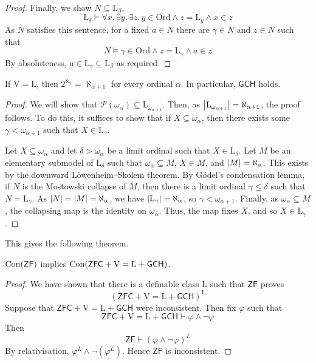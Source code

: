 \begin{proof}
    Finally, we show \( N \subseteq \mathrm{L}_\beta \).
    \[ \mathrm{L}_\delta \vDash \forall x.\, \exists y.\, \exists z.\, y \in \mathrm{Ord} \wedge z = \mathrm{L}_y \wedge x \in z \]
    As \( N \) satisfies this sentence, for a fixed \( a \in N \) there are \( \gamma \in N \) and \( z \in N \) such that
    \[ N \vDash \gamma \in \mathrm{Ord} \wedge z = \mathrm{L}_\gamma \wedge a \in z \]
    By absoluteness, \( a \in \mathrm{L}_\gamma \subseteq \mathrm{L}_\beta \) as required.
\end{proof}
\begin{theorem}
    If \( \mathrm{V} = \mathrm{L} \), then \( 2^{\aleph_\alpha} = \aleph_{\alpha + 1} \) for every ordinal \( \alpha \).
    In particular, \( \mathsf{GCH} \) holds.
\end{theorem}
\begin{proof}
    We will show that \( \mathcal P(\omega_\alpha) \subseteq \mathrm{L}_{\omega_{\alpha + 1}} \).
    Then, as \( \abs{\mathrm{L}_{\omega_{\alpha + 1}}} = \aleph_{\alpha + 1} \), the proof follows.
    To do this, it suffices to show that if \( X \subseteq \omega_\alpha \), then there exists some \( \gamma < \omega_{\alpha + 1} \) such that \( X \in \mathrm{L}_\gamma \).

    Let \( X \subseteq \omega_\alpha \) and let \( \delta > \omega_\alpha \) be a limit ordinal such that \( X \in \mathrm{L}_\delta \).
    Let \( M \) be an elementary submodel of \( \mathrm{L}_\delta \) such that \( \omega_\alpha \subseteq M \), \( X \in M \), and \( \abs{M} = \aleph_\alpha \).
    This exists by the downward L\"owenheim--Skolem theorem.
    By G\"odel's condensation lemma, if \( N \) is the Mostowski collapse of \( M \), then there is a limit ordinal \( \gamma \leq \delta \) such that \( N = \mathrm{L}_\gamma \).
    As \( \abs{N} = \abs{M} = \aleph_\alpha \), we have \( \abs{\mathrm{L}_\gamma} = \aleph_\alpha \), so \( \gamma < \omega_{\alpha + 1} \).
    Finally, as \( \omega_\alpha \subseteq M \), the collapsing map is the identity on \( \omega_\alpha \).
    Thus, the map fixes \( X \), and so \( X \in \mathrm{L}_\gamma \).
\end{proof}
This gives the following theorem.
\begin{theorem}
    \( \operatorname{Con}(\mathsf{ZF}) \) implies \( \operatorname{Con}(\mathsf{ZFC} + \mathrm{V} = \mathrm{L} + \mathsf{GCH}) \).
\end{theorem}
\begin{proof}
    We have shown that there is a definable class \( \mathrm{L} \) such that \( \mathsf{ZF} \) proves
    \[ (\mathsf{ZFC} + \mathrm{V} = \mathrm{L} + \mathsf{GCH})^{\mathrm{L}} \]
    Suppose that \( \mathsf{ZFC} + \mathrm{V} = \mathrm{L} + \mathsf{GCH} \) were inconsistent.
    Then fix \( \varphi \) such that
    \[ \mathsf{ZFC} + \mathrm{V} = \mathrm{L} + \mathsf{GCH} \vdash \varphi \wedge \neg\varphi \]
    Then
    \[ \mathsf{ZF} \vdash (\varphi \wedge \neg\varphi)^L \]
    By relativisation, \( \varphi^L \wedge \neg(\varphi^L) \).
    Hence \( \mathsf{ZF} \) is inconsistent.
\end{proof}
